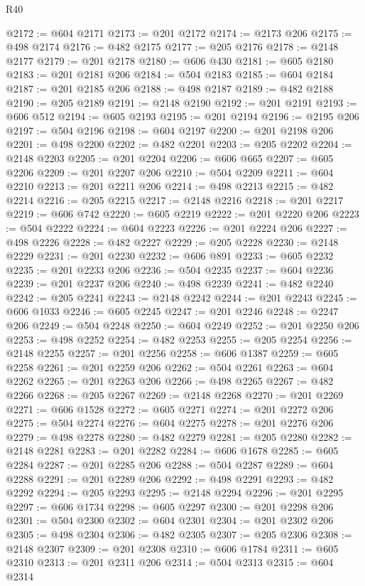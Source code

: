 \begin{lexlean}{R40}
\begin{coremodule}
@2172 := @604 @2171
@2173 := @201 @2172
@2174 := @2173 @206
@2175 := @498 @2174
@2176 := @482 @2175
@2177 := @205 @2176
@2178 := @2148 @2177
@2179 := @201 @2178
@2180 := @606 @430
@2181 := @605 @2180
@2183 := @201 @2181 @206
@2184 := @504 @2183
@2185 := @604 @2184
@2187 := @201 @2185 @206
@2188 := @498 @2187
@2189 := @482 @2188
@2190 := @205 @2189
@2191 := @2148 @2190
@2192 := @201 @2191
@2193 := @606 @512
@2194 := @605 @2193
@2195 := @201 @2194
@2196 := @2195 @206
@2197 := @504 @2196
@2198 := @604 @2197
@2200 := @201 @2198 @206
@2201 := @498 @2200
@2202 := @482 @2201
@2203 := @205 @2202
@2204 := @2148 @2203
@2205 := @201 @2204
@2206 := @606 @665
@2207 := @605 @2206
@2209 := @201 @2207 @206
@2210 := @504 @2209
@2211 := @604 @2210
@2213 := @201 @2211 @206
@2214 := @498 @2213
@2215 := @482 @2214
@2216 := @205 @2215
@2217 := @2148 @2216
@2218 := @201 @2217
@2219 := @606 @742
@2220 := @605 @2219
@2222 := @201 @2220 @206
@2223 := @504 @2222
@2224 := @604 @2223
@2226 := @201 @2224 @206
@2227 := @498 @2226
@2228 := @482 @2227
@2229 := @205 @2228
@2230 := @2148 @2229
@2231 := @201 @2230
@2232 := @606 @891
@2233 := @605 @2232
@2235 := @201 @2233 @206
@2236 := @504 @2235
@2237 := @604 @2236
@2239 := @201 @2237 @206
@2240 := @498 @2239
@2241 := @482 @2240
@2242 := @205 @2241
@2243 := @2148 @2242
@2244 := @201 @2243
@2245 := @606 @1033
@2246 := @605 @2245
@2247 := @201 @2246
@2248 := @2247 @206
@2249 := @504 @2248
@2250 := @604 @2249
@2252 := @201 @2250 @206
@2253 := @498 @2252
@2254 := @482 @2253
@2255 := @205 @2254
@2256 := @2148 @2255
@2257 := @201 @2256
@2258 := @606 @1387
@2259 := @605 @2258
@2261 := @201 @2259 @206
@2262 := @504 @2261
@2263 := @604 @2262
@2265 := @201 @2263 @206
@2266 := @498 @2265
@2267 := @482 @2266
@2268 := @205 @2267
@2269 := @2148 @2268
@2270 := @201 @2269
@2271 := @606 @1528
@2272 := @605 @2271
@2274 := @201 @2272 @206
@2275 := @504 @2274
@2276 := @604 @2275
@2278 := @201 @2276 @206
@2279 := @498 @2278
@2280 := @482 @2279
@2281 := @205 @2280
@2282 := @2148 @2281
@2283 := @201 @2282
@2284 := @606 @1678
@2285 := @605 @2284
@2287 := @201 @2285 @206
@2288 := @504 @2287
@2289 := @604 @2288
@2291 := @201 @2289 @206
@2292 := @498 @2291
@2293 := @482 @2292
@2294 := @205 @2293
@2295 := @2148 @2294
@2296 := @201 @2295
@2297 := @606 @1734
@2298 := @605 @2297
@2300 := @201 @2298 @206
@2301 := @504 @2300
@2302 := @604 @2301
@2304 := @201 @2302 @206
@2305 := @498 @2304
@2306 := @482 @2305
@2307 := @205 @2306
@2308 := @2148 @2307
@2309 := @201 @2308
@2310 := @606 @1784
@2311 := @605 @2310
@2313 := @201 @2311 @206
@2314 := @504 @2313
@2315 := @604 @2314

\end{coremodule}
\end{lexlean}
